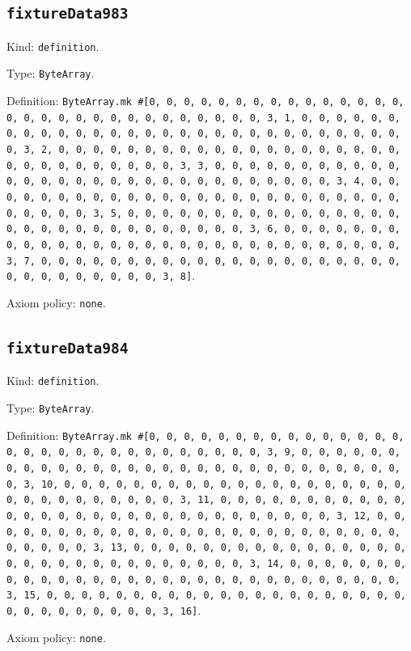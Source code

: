 \documentclass[11pt]{article}
\begin{document}
\subsection*{\texttt{fixtureData983}}
\noindent Kind: \texttt{definition}.\par
\noindent Type: \texttt{ByteArray}.\par
\noindent Definition: \texttt{ByteArray.mk \#[0, 0, 0, 0, 0, 0, 0, 0, 0, 0, 0, 0, 0, 0, 0, 0, 0, 0, 0, 0, 0, 0, 0, 0, 0, 0, 0, 0, 0, 0, 3, 1, 0, 0, 0, 0, 0, 0, 0, 0, 0, 0, 0, 0, 0, 0, 0, 0, 0, 0, 0, 0, 0, 0, 0, 0, 0, 0, 0, 0, 0, 0, 3, 2, 0, 0, 0, 0, 0, 0, 0, 0, 0, 0, 0, 0, 0, 0, 0, 0, 0, 0, 0, 0, 0, 0, 0, 0, 0, 0, 0, 0, 0, 0, 3, 3, 0, 0, 0, 0, 0, 0, 0, 0, 0, 0, 0, 0, 0, 0, 0, 0, 0, 0, 0, 0, 0, 0, 0, 0, 0, 0, 0, 0, 0, 0, 3, 4, 0, 0, 0, 0, 0, 0, 0, 0, 0, 0, 0, 0, 0, 0, 0, 0, 0, 0, 0, 0, 0, 0, 0, 0, 0, 0, 0, 0, 0, 0, 3, 5, 0, 0, 0, 0, 0, 0, 0, 0, 0, 0, 0, 0, 0, 0, 0, 0, 0, 0, 0, 0, 0, 0, 0, 0, 0, 0, 0, 0, 0, 0, 3, 6, 0, 0, 0, 0, 0, 0, 0, 0, 0, 0, 0, 0, 0, 0, 0, 0, 0, 0, 0, 0, 0, 0, 0, 0, 0, 0, 0, 0, 0, 0, 3, 7, 0, 0, 0, 0, 0, 0, 0, 0, 0, 0, 0, 0, 0, 0, 0, 0, 0, 0, 0, 0, 0, 0, 0, 0, 0, 0, 0, 0, 0, 0, 3, 8]}.\par
\noindent Axiom policy: \texttt{none}.\par
\subsection*{\texttt{fixtureData984}}
\noindent Kind: \texttt{definition}.\par
\noindent Type: \texttt{ByteArray}.\par
\noindent Definition: \texttt{ByteArray.mk \#[0, 0, 0, 0, 0, 0, 0, 0, 0, 0, 0, 0, 0, 0, 0, 0, 0, 0, 0, 0, 0, 0, 0, 0, 0, 0, 0, 0, 0, 0, 3, 9, 0, 0, 0, 0, 0, 0, 0, 0, 0, 0, 0, 0, 0, 0, 0, 0, 0, 0, 0, 0, 0, 0, 0, 0, 0, 0, 0, 0, 0, 0, 3, 10, 0, 0, 0, 0, 0, 0, 0, 0, 0, 0, 0, 0, 0, 0, 0, 0, 0, 0, 0, 0, 0, 0, 0, 0, 0, 0, 0, 0, 0, 0, 3, 11, 0, 0, 0, 0, 0, 0, 0, 0, 0, 0, 0, 0, 0, 0, 0, 0, 0, 0, 0, 0, 0, 0, 0, 0, 0, 0, 0, 0, 0, 0, 3, 12, 0, 0, 0, 0, 0, 0, 0, 0, 0, 0, 0, 0, 0, 0, 0, 0, 0, 0, 0, 0, 0, 0, 0, 0, 0, 0, 0, 0, 0, 0, 3, 13, 0, 0, 0, 0, 0, 0, 0, 0, 0, 0, 0, 0, 0, 0, 0, 0, 0, 0, 0, 0, 0, 0, 0, 0, 0, 0, 0, 0, 0, 0, 3, 14, 0, 0, 0, 0, 0, 0, 0, 0, 0, 0, 0, 0, 0, 0, 0, 0, 0, 0, 0, 0, 0, 0, 0, 0, 0, 0, 0, 0, 0, 0, 3, 15, 0, 0, 0, 0, 0, 0, 0, 0, 0, 0, 0, 0, 0, 0, 0, 0, 0, 0, 0, 0, 0, 0, 0, 0, 0, 0, 0, 0, 0, 0, 3, 16]}.\par
\noindent Axiom policy: \texttt{none}.\par
\end{document}

